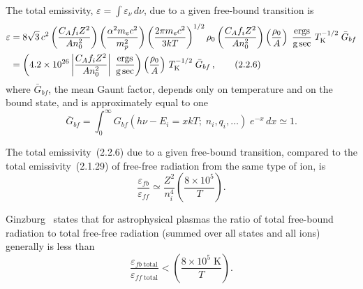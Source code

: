 

The total emissivity, $\varepsilon = \int \varepsilon_\nu \, d\nu$, due to a given free-bound transition is
\begin{align}
\varepsilon &= 8\sqrt{3}\,c^2
\left(\frac{C_A f_i Z^2}{A n_0^2}\right)
\left(\frac{\alpha^2 m_e c^2}{m_p^2}\right)
\left(\frac{2\pi m_e c^2}{3kT}\right)^{1/2}
\rho_0
\left(\frac{C_A f_i Z^2}{A n_0^2}\right)
\left(\frac{\rho_0}{A}\right)
\;\frac{\text{ergs}}{\text{g\,sec}}\;
T_{\rm K}^{-1/2}\;\bar{G}_{bf}
\notag \\
&= \left(4.2 \times 10^{26}
\left|\frac{C_A f_i Z^2}{A n_0^2}\right|
\;\frac{\text{ergs}}{\text{g\,sec}}\right)
\left(\frac{\rho_0}{A}\right)\,
T_{\rm K}^{-1/2}\;\bar{G}_{bf}\,,
\tag{2.2.6}
\end{align}
where $\bar{G}_{bf}$, the mean Gaunt factor, depends only on temperature and on the
bound state, and is approximately equal to one
\begin{equation}
\bar{G}_{bf} = \int_0^\infty G_{bf}(h\nu - E_i = xkT;\; n_i, q_i, \ldots)\; e^{-x}\,dx \simeq 1.
\tag{2.2.7}
\end{equation}

The total emissivity~(2.2.6) due to a given free-bound transition, compared
to the total emissivity~(2.1.29) of free-free radiation from the same type of ion,
is
\begin{equation}
\frac{\varepsilon_{fb}}{\varepsilon_{ff}}
\simeq \frac{Z^2}{n_i^4}\left(\frac{8 \times 10^5}{T}\right).
\tag{2.2.8}
\end{equation}

Ginzburg~\cite{Ginzburg1967} states that for astrophysical plasmas the ratio of total free-bound
radiation to total free-free radiation (summed over all states and all ions)
generally is less than
\begin{equation}
\frac{\varepsilon_{fb\;\text{total}}}{\varepsilon_{ff\;\text{total}}}
< \left(\frac{8 \times 10^5\;\text{K}}{T}\right).
\tag{2.2.9}
\end{equation}


